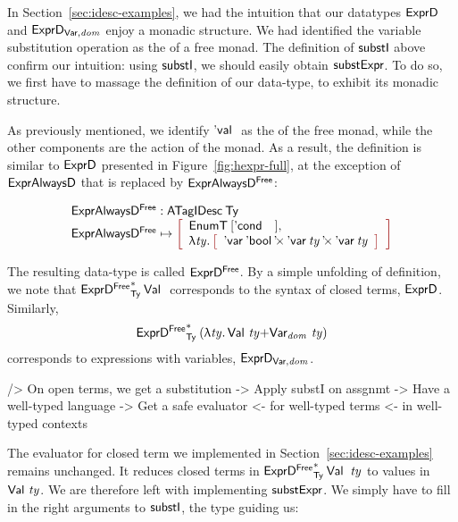 In Section~\ref{sec:idesc-examples}, we had the intuition that our
datatypes $\HExprD$ and $\HExprVarD{\V{dom}}$ enjoy a monadic structure. We had
identified the variable substitution operation as the \bind of a free
monad. The definition of $\substI$ above confirm our intuition: using
$\substI$, we should easily obtain $\substH$. To do so, we first have
to massage the definition of our data-type, to exhibit its monadic
structure.

As previously mentioned, we identify $\Eval{}$ as the \return of the
free monad, while the other components are the action of the monad. As
a result, the definition is similar to $\HExprD$ presented in
Figure~\ref{fig:hexpr-full}, at the exception of $\HExprAD$ that is
replaced by $\HExprAFreeD$:

\[\stk{
\HExprAFreeD : \ATagIDesc{\Ty} \\
\HExprAFreeD \mapsto \bigRedBracket{
                 \begin{array}{l}
                   \EnumT{\red{[}\Econd{}{}{}\red{]}} \red{,} \\
                   \LAM{\V{ty}}
                   \bigRedBracket{
                   \begin{array}{l}
                   \DProd{\DVar{\Ebool}}{\DProd{\DVar{\V{ty}}}{\DVar{\V{ty}}}}
                   \end{array}
                   }
                 \end{array}
                 }
}\]

The resulting data-type is called $\HExprFreeD$. By a simple unfolding
of definition, we note that $\FreeIMonad{\HExprFreeD}{\Ty}{\Val{}}$
corresponds to the syntax of closed terms, $\HExprD$. Similarly,
$$\FreeIMonad{\HExprFreeD}{\Ty}{(\LAM{\V{ty}} \SUM{\Val{\V{ty}}}{\Var{\V{dom}}{\V{ty}}})}$$
corresponds to expressions with variables, $\HExprVarD{\V{dom}}$.

\begin{wstructure}
    /> On open terms, we get a substitution
        -> Apply substI on assgnmt
            -> Have a well-typed language
            -> Get a safe evaluator 
                <- for well-typed terms 
                <- in well-typed contexts
\end{wstructure}

The evaluator for closed term we implemented in
Section~\ref{sec:idesc-examples} remains unchanged. It reduces closed
terms in $\FreeIMonad{\HExprFreeD}{\Ty}{\Val{}}\: \V{ty}$ to values in
$\Val{\V{ty}}$. We are therefore left with implementing $\substH$. We
simply have to fill in the right arguments to $\substI$, the type
guiding us:


